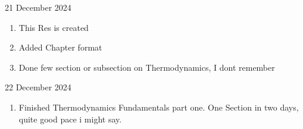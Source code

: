 \documentclass[../Main.tex]{subfiles}
\begin{document}
21 December 2024
\begin{enumerate}
    \item This Res is created
    \item Added Chapter format
    \item Done few section or subsection on Thermodynamics, I dont remember
\end{enumerate}

22 December 2024
\begin{enumerate}
    \item Finished Thermodynamics Fundamentals part one. One Section in two days, quite good pace i might say.
\end{enumerate}
\end{document}

